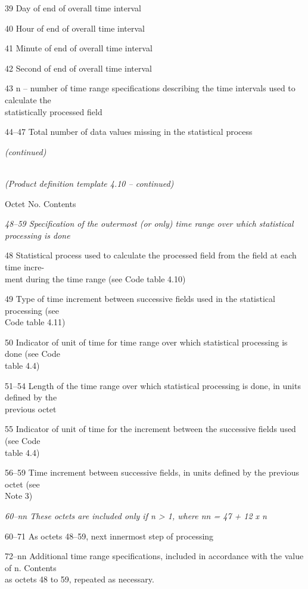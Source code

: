 39 Day of end of overall time interval

40 Hour of end of overall time interval

41 Minute of end of overall time interval

42 Second of end of overall time interval

43 n -- number of time range specifications describing the time intervals used to calculate the\\
statistically processed field

44--47 Total number of data values missing in the statistical process

\emph{(continued)}

\emph{\\
(Product definition template 4.10 -- continued)}

Octet No. Contents

\emph{48--59 Specification of the outermost (or only) time range over which statistical}\\
\emph{processing is done}

48 Statistical process used to calculate the processed field from the field at each time incre-\\
ment during the time range (see Code table 4.10)

49 Type of time increment between successive fields used in the statistical processing (see\\
Code table 4.11)

50 Indicator of unit of time for time range over which statistical processing is done (see Code\\
table 4.4)

51--54 Length of the time range over which statistical processing is done, in units defined by the\\
previous octet

55 Indicator of unit of time for the increment between the successive fields used (see Code\\
table 4.4)

56--59 Time increment between successive fields, in units defined by the previous octet (see\\
Note 3)

\emph{60--nn These octets are included only if n \textgreater{} 1, where nn = 47 + 12 x n}

60--71 As octets 48--59, next innermost step of processing

72--nn Additional time range specifications, included in accordance with the value of n. Contents\\
as octets 48 to 59, repeated as necessary.

